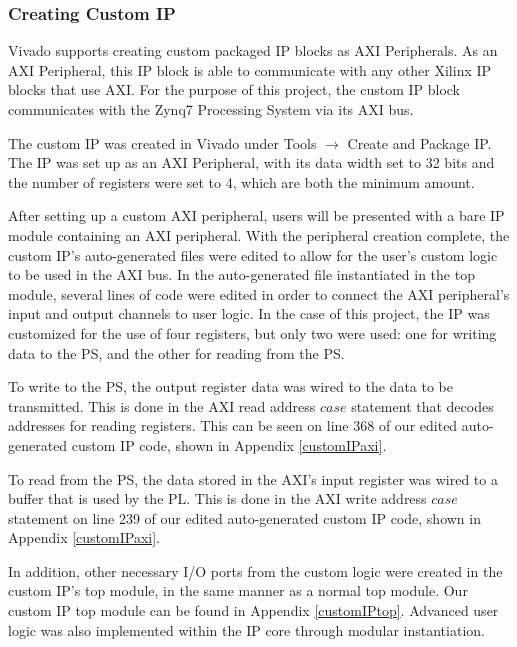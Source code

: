 \subsubsection{Creating Custom IP} \label{sssec:creatingCustomIP}
Vivado supports creating custom packaged IP blocks as AXI Peripherals. As an AXI Peripheral, this IP block is able to communicate with any other Xilinx IP blocks that use AXI. For the purpose of this project, the custom IP block communicates with the Zynq7 Processing System via its AXI bus.
\par
The custom IP was created in Vivado under Tools $\rightarrow$ Create and Package IP. The IP was set up as an AXI Peripheral, with its data width set to 32 bits and the number of registers were set to 4, which are both the minimum amount.
\par
After setting up a custom AXI peripheral, users will be presented with a bare IP module containing an AXI peripheral. With the peripheral creation complete, the custom IP's auto-generated files were edited to allow for the user's custom logic to be used in the AXI bus. In the auto-generated file instantiated in the top module, several lines of code were edited in order to connect the AXI peripheral's input and output channels to user logic. In the case of this project, the IP was customized for the use of four registers, but only two were used: one for writing data to the PS, and the other for reading from the PS. 
\par
To write to the PS, the output register data was wired to the data to be transmitted. This is done in the AXI read address $case$ statement that decodes addresses for reading registers. This can be seen on line 368 of our edited auto-generated custom IP code, shown in Appendix \ref{customIPaxi}.
\par
To read from the PS, the data stored in the AXI's input register was wired to a buffer that is used by the PL. This is done in the AXI write address $case$ statement on line 239 of our edited auto-generated custom IP code, shown in Appendix \ref{customIPaxi}.
\par
In addition, other necessary I/O ports from the custom logic were created in the custom IP's top module, in the same manner as a normal top module. Our custom IP top module can be found in Appendix \ref{customIPtop}. Advanced user logic was also implemented within the IP core through modular instantiation.

